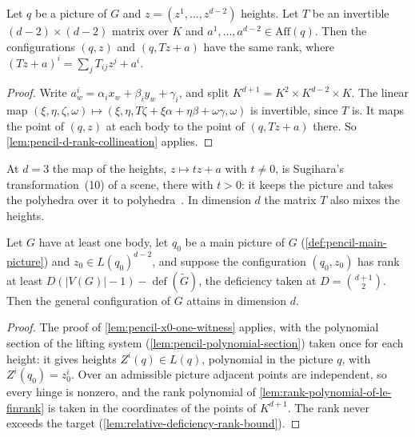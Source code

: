 \begin{lemma}
  \label{lem:pencil-d-rank-scale-shift}
  \leanok
  Let $q$ be a picture of $G$ and $z = (z^1, \dots, z^{d-2})$ heights.
  Let $T$ be an invertible $(d-2) \times (d-2)$ matrix over $K$ and
  $a^1, \dots, a^{d-2} \in \mathrm{Aff}(q)$. Then the configurations
  $(q, z)$ and $(q, Tz + a)$ have the same rank, where
  $(Tz + a)^i = \sum_j T_{ij} z^j + a^i$.
\end{lemma}
\begin{proof}
  \leanok
  Write $a^i_w = \alpha_i x_w + \beta_i y_w + \gamma_i$, and split
  $K^{d+1} = K^2 \times K^{d-2} \times K$. The linear map
  $(\xi, \eta, \zeta, \omega) \mapsto
  (\xi, \eta, T\zeta + \xi\alpha + \eta\beta + \omega\gamma, \omega)$ is
  invertible, since $T$ is. It maps the point of $(q, z)$ at each body to
  the point of $(q, Tz + a)$ there. So
  \cref{lem:pencil-d-rank-collineation} applies.
\end{proof}

At $d = 3$ the map of the heights, $z \mapsto tz + a$ with $t \ne 0$, is
Sugihara's transformation~(10) of a scene, there with $t > 0$: it keeps
the picture and takes the polyhedra over it to
polyhedra~\cite[p.~85]{sugihara1984}. In dimension $d$ the matrix $T$
also mixes the heights.

\begin{lemma}
  \label{lem:pencil-d-x0-one-witness}
  \leanok
  Let $G$ have at least one body, let $q_0$ be a main picture of $G$
  (\cref{def:pencil-main-picture}) and $z_0 \in L(q_0)^{d-2}$, and
  suppose the configuration $(q_0, z_0)$ has rank at least
  $D(|V(G)| - 1) - \operatorname{def}(\tilde G)$, the deficiency taken
  at $D = \binom{d+1}{2}$. Then the general configuration of $G$ attains
  in dimension $d$.
\end{lemma}
\begin{proof}
  \leanok
  The proof of \cref{lem:pencil-x0-one-witness} applies, with the
  polynomial section of the lifting system
  (\cref{lem:pencil-polynomial-section}) taken once for each height: it
  gives heights $Z^i(q) \in L(q)$, polynomial in the picture $q$, with
  $Z^i(q_0) = z^i_0$. Over an admissible picture adjacent points are
  independent, so every hinge is nonzero, and the rank polynomial of
  \cref{lem:rank-polynomial-of-le-finrank} is taken in the coordinates of
  the points of $K^{d+1}$. The rank never exceeds the target
  (\cref{lem:relative-deficiency-rank-bound}).
\end{proof}

